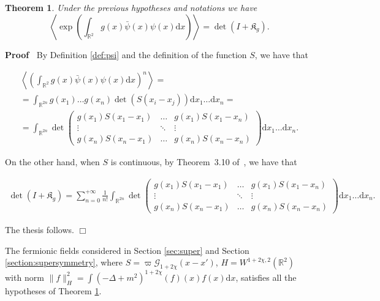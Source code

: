 \documentclass[a4paper,10pt]{article}
\newcommand{\mathd}{\mathrm{d}}
\newenvironment{proof}{\noindent\textbf{Proof\ }}{\hspace*{\fill}$\Box$\medskip}
\newtheorem{theorem}{Theorem}
\begin{document}
\begin{theorem}
  \label{theorem_representation}Under the previous hypotheses and notations we
  have
  \[ \left\langle \exp \left( \int_{\mathbb{R}^2} g (x) \bar{\psi} (x) \psi
     (x) \mathd x \right) \right\rangle = \det (I + \mathfrak{K}_g) . \]
\end{theorem}

\begin{proof}
  By Definition \ref{def:psi} and the definition of the function $S$, we have
  that
  
  \begin{multline*}
    \left\langle \left( \int_{\mathbb{R}^2} g (x) \bar{\psi} (x) \psi (x)
    \mathd x \right)^n \right\rangle =\\
    = \int_{\mathbb{R}^{2 n}} g (x_1) \ldots g (x_n) \det (S (x_i - x_j))
    \mathd x_1 \ldots \mathd x_n =\\
    = \int_{\mathbb{R}^{2 n}} \det \left( \begin{array}{ccc}
      g (x_1) S (x_1 - x_1) & \ldots & g (x_1) S (x_1 - x_n)\\
      \vdots & \ddots & \vdots\\
      g (x_n) S (x_n - x_1) & \ldots & g (x_n) S (x_n - x_n)
    \end{array} \right) \mathd x_1 \ldots \mathd x_n .
  \end{multline*}
  
  On the other hand, when $S$ is continuous, by Theorem~3.10
  of~{\cite{Simon2005}}, we have that
  
  \begin{multline*}
    \det \left( I +\mathfrak{K}_g \right) = \sum_{n = 0}^{+ \infty} \frac{1}{n!} \int_{\mathbb{R}^{2 n}} \det \left(
    \begin{array}{ccc}
      g (x_1) S (x_1 - x_1) & \ldots & g (x_1) S (x_1 - x_n)\\
      \vdots & \ddots & \vdots\\
      g (x_n) S (x_n - x_1) & \ldots & g (x_n) S (x_n - x_n)
    \end{array} \right) \mathd x_1 \ldots \mathd x_n .
  \end{multline*}
  
  The thesis follows.
\end{proof}

\begin{remark}
  \label{remark_representation}The fermionic fields considered in Section
  \ref{sec:super} and Section \ref{section:supersymmetry}, where $S = \varpi
  \mathcal{G}_{1 + 2 \chi} (x - x')$, $H = W^{1 +2 \chi, 2} (\mathbb{R}^2)$
  with norm $\| f \|_H^2 = \int (- \Delta + m^2)^{1 + 2 \chi} (f) (x) f (x)
  \mathd x$, satisfies all the hypotheses of Theorem
  \ref{theorem_representation}.
\end{remark}
\end{document}
